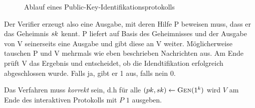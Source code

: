   
\begin{figure}
\begin{center}
  \caption{Ablauf eines Public-Key-Identifikationsprotokolls}
  \label{fig:pki-identifikation}
\end{center}
\end{figure}


Der Verifier erzeugt also eine Ausgabe, mit deren Hilfe
P beweisen muss, dass er das Geheimnis $sk$ kennt. P liefert auf Basis
des Geheimnisses und der Ausgabe von V seinerseits eine Ausgabe und gibt
diese an V weiter. Möglicherweise tauschen P und V mehrmals wie eben
beschrieben Nachrichten aus. Am Ende prüft V das Ergebnis und
entscheidet, ob die Idendtifikation erfolgreich abgeschlossen wurde. Falls ja,
gibt er 1 aus, falls nein 0. 

Das Verfahren muss \emph{korrekt} sein, d.h für alle $(pk, sk)
\leftarrow \textsc{Gen}(1^k)$ wird $V$ am Ende des interaktiven Protokolls mit
$P$ $1$ ausgeben. 

